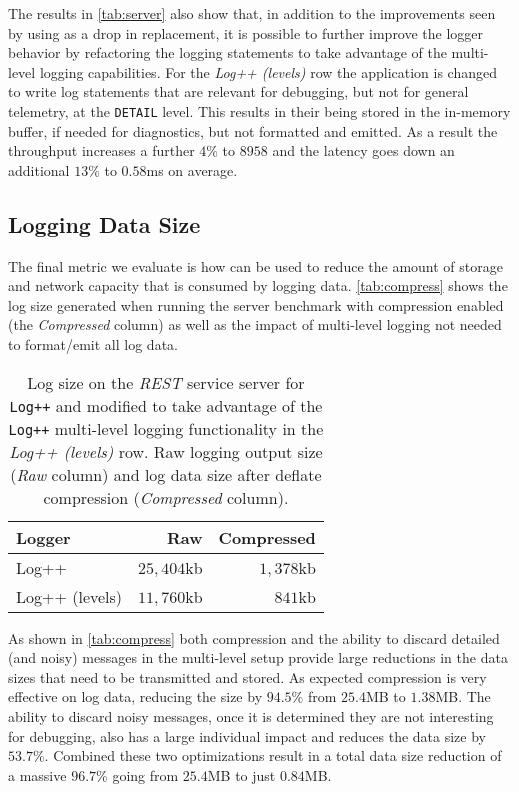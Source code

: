 The results in \autoref{tab:server} also show that, in addition to the improvements 
seen by using \projn as a drop in replacement, it is possible to further improve the 
logger behavior by refactoring the logging statements to take advantage of the 
multi-level logging capabilities. For the \emph{Log++ (levels)} row the application is 
changed to write log statements that are relevant for debugging, but not for general 
telemetry, at the \texttt{DETAIL} level. This results in their being stored in 
the in-memory buffer, if needed for diagnostics, but not formatted and emitted. As 
a result the throughput increases a further $4\%$ to $8958$ and the latency goes 
down an additional $13\%$ to $0.58$ms on average.

\subsection{Logging Data Size}
The final metric we evaluate is how \projn can be used to reduce the amount of 
storage and network capacity that is consumed by logging data. \autoref{tab:compress} 
shows the log size generated when running the server benchmark with compression 
enabled (the \emph{Compressed} column) as well as the impact of multi-level 
logging not needed to format/emit all log data.

\begin{table}[t]  
    \centering
    {\small
    \begin{tabular}{l | r r }
    Logger        & Raw & Compressed \\
    \hline
    Log++          & $25,404$kb & $1,378$kb \\
    Log++ (levels) & $11,760$kb & $841$kb   \\
    \end{tabular}
    }
    \vspace{2mm}
    \caption{\small Log size on the \emph{REST} service server for \texttt{Log++}
    and modified to take advantage of the \texttt{Log++} 
    multi-level logging functionality in the \emph{Log++ (levels)} row. Raw 
    logging output size (\emph{Raw} column) and log data size after deflate 
    compression (\emph{Compressed} column).}
    \label{tab:compress}
\end{table}

As shown in \autoref{tab:compress} both compression and the ability to 
discard detailed (and noisy) messages in the multi-level setup provide 
large reductions in the data sizes that need to be transmitted and stored. 
As expected compression is very effective on log data, reducing the size 
by $94.5\%$ from $25.4$MB to $1.38$MB. The ability to discard noisy messages, 
once it is determined they are not interesting for debugging, also has a 
large individual impact and reduces the data size by $53.7\%$. Combined these 
two optimizations result in a total data size reduction of a massive $96.7\%$ 
going from $25.4$MB to just $0.84$MB.

